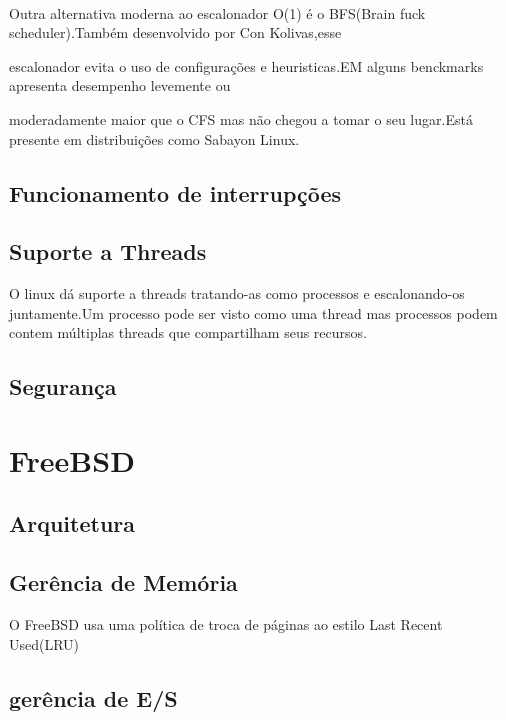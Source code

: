 \documentclass[conference]{IEEEtran}
\begin{document}
\\

Outra alternativa moderna ao escalonador O(1) é o BFS(Brain fuck scheduler).Também desenvolvido por Con Kolivas,esse 

escalonador evita o uso de configurações e heuristicas.EM alguns benckmarks apresenta desempenho levemente ou 

moderadamente maior que o CFS mas não chegou a tomar o seu lugar.Está presente em distribuições como Sabayon Linux\cite{LinuxSchedulerBFS}.
\cite{LinuxSchedulerWiki}

\subsection{Funcionamento de interrupções}\label{sec:LinuxInt}

\subsection{Suporte a Threads}\label{sec:LinuxThreads}
O linux dá suporte a threads tratando-as como processos e escalonando-os juntamente.Um processo pode ser visto como uma thread mas
processos podem contem múltiplas threads que compartilham seus recursos\cite{LinuxSchedulerIBM}.
\subsection{Segurança}\label{sec:LinuxSec}

\section{FreeBSD}\label{sec:BSD}

\subsection{Arquitetura}\label{sec:BSDArq}

\subsection{Gerência de Memória}\label{sec:BSDMem}
O FreeBSD usa uma política de troca de páginas ao estilo Last Recent Used(LRU)\cite{FreeBsdArc}

\subsection{gerência de E/S}\label{sec:BSDES}
\end{document}

